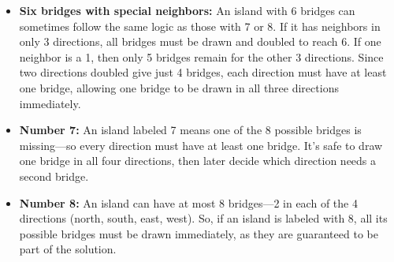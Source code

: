 \begin{itemize}
\begin{itemize}
		      \item \textbf{Six bridges with special neighbors:} An island with 6 bridges can sometimes follow the same logic as those with 7 or 8. If it has neighbors in only 3 directions, all bridges must be drawn and doubled to reach 6. If one neighbor is a 1, then only 5 bridges remain for the other 3 directions. Since two directions doubled give just 4 bridges, each direction must have at least one bridge, allowing one bridge to be drawn in all three directions immediately.
		      \item \textbf{Number 7:} An island labeled 7 means one of the 8 possible bridges is missing—so every direction must have at least one bridge. It's safe to draw one bridge in all four directions, then later decide which direction needs a second bridge.
		      \item \textbf{Number 8:} An island can have at most 8 bridges—2 in each of the 4 directions (north, south, east, west). So, if an island is labeled with 8, all its possible bridges must be drawn immediately, as they are guaranteed to be part of the solution.
	      \end{itemize}
\end{itemize}


